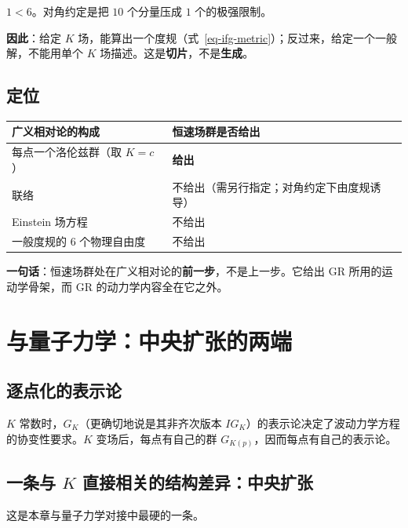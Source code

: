 \documentclass[
  chinese,
  a4paper,
  UTF8,
  12pt,
  oneside,
  openany]{ctexbook}
\newcounter{none} %
\theoremstyle{plain}
\theoremstyle{plain}
\theoremstyle{plain}
\theoremstyle{definition}
\theoremstyle{plain}
\theoremstyle{plain}
\theoremstyle{remark}
\begin{document}
\(1<6\)。对角约定是把 \(10\) 个分量压成 \(1\) 个的极强限制。

\textbf{因此}：给定 \(K\)
场，能算出一个度规（式~\ref{eq-ifg-metric}）；反过来，给定一个一般解，不能用单个
\(K\) 场描述。这是\textbf{切片}，不是\textbf{生成}。

\subsection{定位}\label{ux5b9aux4f4d}

{\def\LTcaptype{none} %
\begin{longtable}[]{@{}ll@{}}
\toprule\noalign{}
广义相对论的构成 & 恒速场群是否给出 \\
\midrule\noalign{}
\endhead
\bottomrule\noalign{}
\endlastfoot
每点一个洛伦兹群（取 \(K=c\)） & \textbf{给出} \\
联络 & 不给出（需另行指定；对角约定下由度规诱导） \\
Einstein 场方程 & 不给出 \\
一般度规的 \(6\) 个物理自由度 & 不给出 \\
\end{longtable}
}

\textbf{一句话}：恒速场群处在广义相对论的\textbf{前一步}，不是上一步。它给出
GR 所用的运动学骨架，而 GR 的动力学内容全在它之外。

\section{与量子力学：中央扩张的两端}\label{sec-ifg-qm}

\subsection{逐点化的表示论}\label{ux9010ux70b9ux5316ux7684ux8868ux793aux8bba}

\(K\) 常数时，\(G_K\)（更确切地说是其非齐次版本
\(IG_K\)）的表示论决定了波动力学方程的协变性要求。\(K\)
变场后，每点有自己的群 \(G_{K(p)}\)，因而每点有自己的表示论。

\subsection{\texorpdfstring{一条与 \(K\)
直接相关的结构差异：中央扩张}{一条与 K 直接相关的结构差异：中央扩张}}\label{ux4e00ux6761ux4e0e-k-ux76f4ux63a5ux76f8ux5173ux7684ux7ed3ux6784ux5deeux5f02ux4e2dux592eux6269ux5f20}

这是本章与量子力学对接中最硬的一条。
\end{document}
